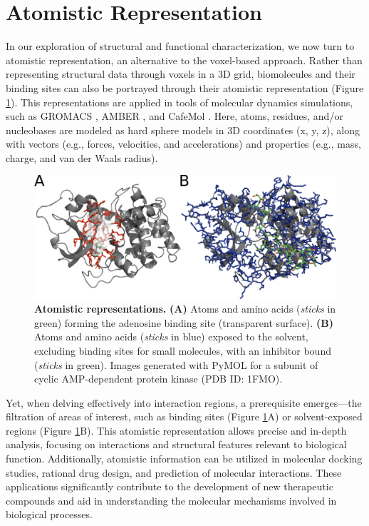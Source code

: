 \documentclass[Ingles]{phdthesis}
\def\eg{e.g.\onedot}
\begin{document}
\section{Atomistic Representation}

In our exploration of structural and functional characterization, we now turn to atomistic representation, an alternative to the voxel-based approach. Rather than representing structural data through voxels in a \acs{3D} grid, biomolecules and their binding sites can also be portrayed through their atomistic representation (Figure \ref{fig:atomistic-representation}). This representations are applied in tools of molecular dynamics simulations, such as GROMACS \cite{gromacs}, AMBER \cite{amber}, and CafeMol \cite{kenzaki2011}. Here, atoms, residues, and/or nucleobases are modeled as hard sphere models in \acs{3D} coordinates (x, y, z), along with vectors (\eg, forces, velocities, and accelerations) and properties (\eg, mass, charge, and van der Waals radius).

\begin{figure}[h]
  \centerline{\includegraphics[scale=1]{images/atomistic-representation.png}}
  \caption[Atomistic representations]{\textbf{Atomistic representations.} \textbf{(A)} Atoms and amino acids (\textit{sticks} in green) forming the adenosine binding site (transparent surface). \textbf{(B)} Atoms and amino acids (\textit{sticks} in blue) exposed to the solvent, excluding binding sites for small molecules, with an inhibitor bound (\textit{sticks} in green). Images generated with PyMOL for a subunit of cyclic AMP-dependent protein kinase (PDB ID: 1FMO).}
  \label{fig:atomistic-representation}
\end{figure}

Yet, when delving effectively into interaction regions, a prerequisite emerges---the filtration of areas of interest, such as binding sites (Figure \ref{fig:atomistic-representation}A) or solvent-exposed regions (Figure \ref{fig:atomistic-representation}B). This atomistic representation allows precise and in-depth analysis, focusing on interactions and structural features relevant to biological function. Additionally, atomistic information can be utilized in molecular docking studies, rational drug design, and prediction of molecular interactions. These applications significantly contribute to the development of new therapeutic compounds and aid in understanding the molecular mechanisms involved in biological processes.
\end{document}
